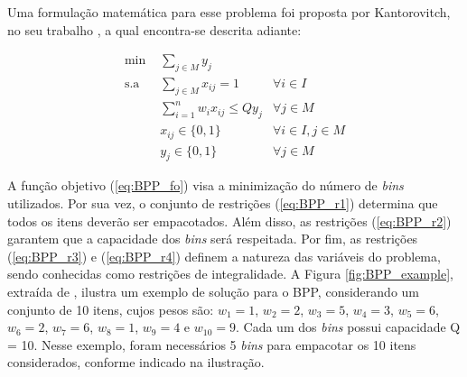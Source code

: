 Uma formulação matemática para esse problema foi proposta por Kantorovitch, no seu trabalho \cite{Kantorovich1960}, a qual encontra-se descrita adiante: 

\begin{align}
    \text{min }& \sum_{j \in M} y_j & \label{eq:BPP_fo}\\
    \text{s.a }& \sum_{j \in M} x_{ij} = 1  &\forall i \in I \label{eq:BPP_r1}\\
    & \sum_{i=1}^{n} w_i x_{ij} \leq Q y_j &\forall j \in M \label{eq:BPP_r2}\\
    & x_{ij} \in \{0,1\}        &\forall i \in I, j \in M\label{eq:BPP_r3}\\
    & y_j \in \{0,1\}           &\forall j \in M \label{eq:BPP_r4}
\end{align}

A função objetivo (\ref{eq:BPP_fo}) visa a minimização do número de \textit{bins} utilizados. Por sua vez, o conjunto de restrições (\ref{eq:BPP_r1}) determina que todos os itens deverão ser empacotados. Além disso, as restrições (\ref{eq:BPP_r2}) garantem que a capacidade dos \textit{bins} será respeitada. Por fim, as restrições (\ref{eq:BPP_r3}) e (\ref{eq:BPP_r4}) definem a natureza das variáveis do problema, sendo conhecidas como restrições de integralidade. A Figura \ref{fig:BPP_example}, extraída de \cite{Bulhoes2019}, ilustra um exemplo de solução para o BPP, considerando um conjunto de 10 itens, cujos pesos são: $w_1 = 1$, $w_2 = 2$, $w_3 = 5$, $w_4 = 3$, $w_5 = 6$, $w_6 = 2$, $w_7 = 6$, $w_8 = 1$, $w_9 = 4$ e $w_{10} = 9$. Cada um dos \textit{bins} possui capacidade Q = 10. Nesse exemplo, foram necessários 5 \textit{bins} para empacotar os 10 itens considerados, conforme indicado na ilustração. 




